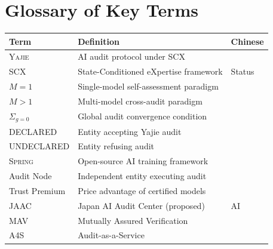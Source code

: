 \documentclass[11pt,a4paper]{article}
\theoremstyle{definition}
\theoremstyle{remark}
\newcommand{\Yajie}{\textsc{Yajie}}
\newcommand{\Spring}{\textsc{Spring}}
\newcommand{\declaredState}{\textsf{DECLARED}}
\newcommand{\undeclaredState}{\textsf{UNDECLARED}}
\newcommand{\sumGZero}{\Sigma_{g=0}}
\newcommand{\MAone}{M=1}
\newcommand{\MAmany}{M>1}
\begin{document}
\section{Glossary of Key Terms}
\begin{center}
\begin{tabular}{lll}
\toprule
\textbf{Term} & \textbf{Definition} & \textbf{Chinese} \\
\midrule
\Yajie & AI audit protocol under SCX &  \\
SCX & State-Conditioned eXpertise framework & Status \\
$\MAone$ & Single-model self-assessment paradigm &  \\
$\MAmany$ & Multi-model cross-audit paradigm &  \\
$\sumGZero$ & Global audit convergence condition &  \\
\declaredState & Entity accepting Yajie audit &  \\
\undeclaredState & Entity refusing audit &  \\
\Spring & Open-source AI training framework &  \\
Audit Node & Independent entity executing audit &  \\
Trust Premium & Price advantage of certified models &  \\
JAAC & Japan AI Audit Center (proposed) & AI \\
MAV & Mutually Assured Verification &  \\
A4S & Audit-as-a-Service &  \\
\bottomrule
\end{tabular}
\end{center}
\end{document}
